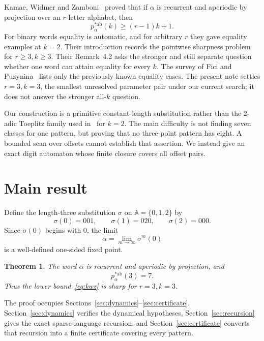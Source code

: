 \documentclass[11pt]{article}
\newtheorem{theorem}{Theorem}[section]
\newcommand{\A}{\mathbb A}
\begin{document}
Kamae, Widmer and Zamboni~\cite[Theorem~4]{KWZ} proved that if $\alpha$ is
recurrent and aperiodic by projection over an $r$-letter alphabet, then
\begin{equation}
p_\alpha^{*\mathrm{ab}}(k)\ge(r-1)k+1.
\label{eq:kwz}
\end{equation}
For binary words equality is automatic, and for arbitrary $r$ they gave
equality examples at $k=2$. Their introduction records the pointwise
sharpness problem for $r\ge3,k\ge3$. Their Remark~4.2 asks the stronger and
still separate question whether one word can attain equality for every $k$.
The survey of Fici and Puzynina~\cite{FP} lists only the previously known
equality cases. The present note settles $r=3,k=3$, the smallest unresolved
parameter pair under our current search; it does not answer the stronger
all-$k$ question.

Our construction is a primitive constant-length substitution rather than the
2-adic Toeplitz family used in~\cite{KWZ} for $k=2$. The main difficulty is not
finding seven classes for one pattern, but proving that no three-point pattern
has eight. A bounded scan over offsets cannot establish that assertion. We
instead give an exact digit automaton whose finite closure covers all offset
pairs.

\section{Main result}

Define the length-three substitution $\sigma$ on $\A=\{0,1,2\}$ by
\begin{equation}
\sigma(0)=001,\qquad \sigma(1)=020,\qquad \sigma(2)=000.
\label{eq:substitution}
\end{equation}
Since $\sigma(0)$ begins with $0$, the limit
\[
\alpha=\lim_{m\to\infty}\sigma^m(0)
\]
is a well-defined one-sided fixed point.

\begin{theorem}\label{thm:main}
The word $\alpha$ is recurrent and aperiodic by projection, and
\[
\boxed{p_\alpha^{*\mathrm{ab}}(3)=7.}
\]
Thus the lower bound~\eqref{eq:kwz} is sharp for $r=3,k=3$.
\end{theorem}

The proof occupies Sections~\ref{sec:dynamics}--\ref{sec:certificate}.
Section~\ref{sec:dynamics} verifies the dynamical hypotheses,
Section~\ref{sec:recursion} gives the exact sparse-language recursion, and
Section~\ref{sec:certificate} converts that recursion into a finite
certificate covering every pattern.
\end{document}
